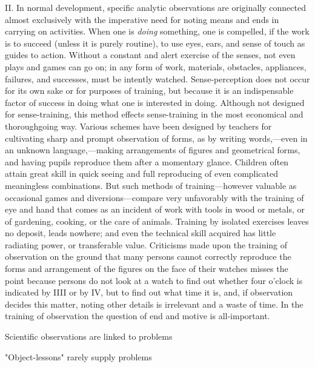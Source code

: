 \documentclass[letterpaper]{book}
\begin{document}
II. In normal development, specific analytic observations are originally
connected almost exclusively with the imperative need for noting means
and ends in carrying on activities. When one is \emph{doing} something,
one is compelled, if the work is to succeed (unless it is purely
routine), to use eyes, ears, and sense of touch as guides to action.
Without a constant and alert exercise of the senses, not even plays and
games can go on; in any form of work, materials, obstacles, appliances,
failures, and successes, must be intently watched. Sense-perception does
not occur for its own sake or for purposes of training, but because it
is an indispensable factor of success in doing what one is interested in
doing. Although not designed for sense-training, this method effects
sense-training in the most economical and thoroughgoing way. Various
schemes have been designed by teachers for cultivating sharp and prompt
observation of forms, as by writing words,---even in an unknown
language,---making arrangements of figures and geometrical forms, and
having pupils reproduce them after a momentary glance. Children often
attain great skill in quick seeing and full reproducing of even
complicated meaningless combinations. But such methods of
training---however
valuable as occasional games and diversions---compare very unfavorably
with the training of eye and hand that comes as an incident of work with
tools in wood or metals, or of gardening, cooking, or the care of
animals. Training by isolated exercises leaves no deposit, leads
nowhere; and even the technical skill acquired has little radiating
power, or transferable value. Criticisms made upon the training of
observation on the ground that many persons cannot correctly reproduce
the forms and arrangement of the figures on the face of their watches
misses the point because persons do not look at a watch to find out
whether four o'clock is indicated by IIII or by IV, but to find out what
time it is, and, if observation decides this matter, noting other
details is irrelevant and a waste of time. In the training of
observation the question of end and motive is all-important.

Scientific observations are linked to problems

"Object-lessons" rarely supply problems
\end{document}
